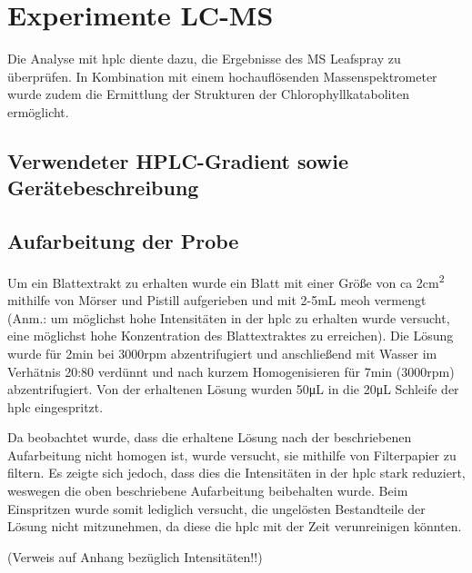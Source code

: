 \chapter{Experimente LC-MS} 

Die Analyse mit \gls{hplc} diente dazu, die Ergebnisse des MS Leafspray zu überprüfen. In Kombination mit einem hochauflösenden Massenspektrometer wurde zudem die Ermittlung der Strukturen der Chlorophyllkataboliten ermöglicht. \\

\section{Verwendeter HPLC-Gradient sowie Gerätebeschreibung}

\section{Aufarbeitung der Probe} \label{sec:HPLCAufarbeitungderProbe}

Um ein Blattextrakt zu erhalten wurde ein Blatt mit einer Größe von \gls{ca} 2\si{cm^{2}} mithilfe von Mörser und Pistill aufgerieben und mit 2-5mL \gls{meoh} vermengt (Anm.: um möglichst hohe Intensitäten in der \gls{hplc} zu erhalten wurde versucht, eine möglichst hohe Konzentration des Blattextraktes zu erreichen). Die Lösung wurde für 2min bei 3000rpm abzentrifugiert und anschließend mit Wasser im Verhätnis 20:80 verdünnt und nach kurzem Homogenisieren für 7min (3000rpm) abzentrifugiert. Von der erhaltenen Lösung wurden 50\si{\uL} in die 20\si{\uL} Schleife der \gls{hplc} eingespritzt. 

Da beobachtet wurde, dass die erhaltene Lösung nach der beschriebenen Aufarbeitung nicht homogen ist, wurde versucht, sie mithilfe von Filterpapier zu filtern. Es zeigte sich jedoch, dass dies die Intensitäten in der \gls{hplc} stark reduziert, weswegen die oben beschriebene Aufarbeitung beibehalten wurde. Beim Einspritzen wurde somit lediglich versucht, die ungelösten Bestandteile der Lösung nicht mitzunehmen, da diese die \gls{hplc} mit der Zeit verunreinigen könnten.

(Verweis auf Anhang bezüglich Intensitäten!!)



